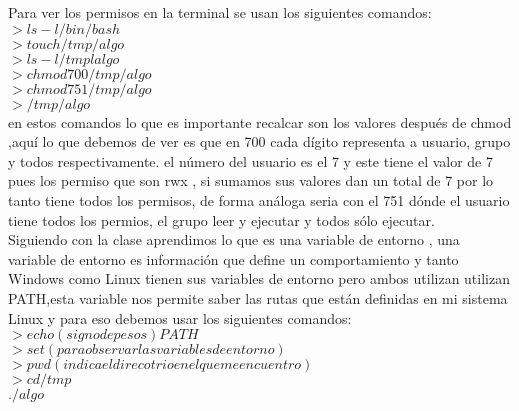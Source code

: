 \documentclass[letterpaper, 12pt, oneside]{article}%
\begin{document}
	Para ver los permisos en la terminal se usan los siguientes comandos:\\
	$>ls -l /bin/bash$\\
	$>touch  /tmp/algo$\\
	$>ls -l   /tmplalgo$\\
	$>chmod   700   /tmp/algo$\\
	$>chmod  751   /tmp/algo$\\
	$>/tmp/algo$\\
	
	
	en estos comandos lo que es importante recalcar son los valores después de chmod ,aquí lo que debemos de ver es que en 700 cada dígito representa a usuario, grupo y todos respectivamente. el número del usuario es el 7 y este tiene el valor de 7 pues los permiso que son rwx , si sumamos sus valores dan un total de 7 por lo tanto tiene todos los permisos, de forma análoga seria con el 751 dónde el usuario tiene todos los permios, el grupo leer y ejecutar y todos sólo ejecutar.\\
	
	Siguiendo con la clase aprendimos lo que es una variable de entorno , una variable de entorno es información que define un comportamiento y tanto Windows como Linux tienen sus variables de entorno pero ambos utilizan utilizan PATH,esta variable nos permite saber las rutas que están definidas en mi sistema Linux y para eso debemos usar los siguientes comandos:\\
	$>echo (signo de pesos)PATH$\\
	$>set (para observar las variables de entorno)$\\
	$>pwd (indica el direcotrio en el que me encuentro)$\\
	$>cd /tmp$\\
	$.  /algo$\\
	
	
	
	
	
	
	
	
	
	
	
	
	
	
	
	
\end{document}
